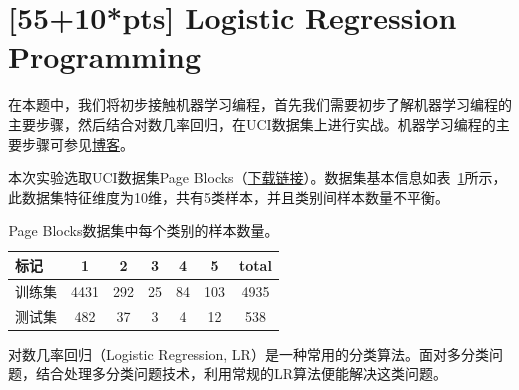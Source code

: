 \documentclass[a4paper,UTF8]{article}
\numberwithin{equation}{section}
\begin{document}
\section{[55+10*pts] Logistic Regression Programming}
在本题中，我们将初步接触机器学习编程，首先我们需要初步了解机器学习编程的主要步骤，然后结合对数几率回归，在UCI数据集上进行实战。机器学习编程的主要步骤可参见\href{http://blog.csdn.net/cqy_chen/article/details/78690975}{博客}。

本次实验选取UCI数据集Page Blocks（\href{http://lamda.nju.edu.cn/ml2018/PS2/PS2_dataset.zip}{下载链接}）。数据集基本信息如表~\ref{data_inf}所示，此数据集特征维度为10维，共有5类样本，并且类别间样本数量不平衡。

\begin{table}[!h]
	\centering
	\caption{Page Blocks数据集中每个类别的样本数量。}\vspace{3mm}
	\label{data_inf}
	\begin{tabular}{l|cccccc}\hline
		标记     & 1    & 2   & 3  & 4  & 5   & total \\ \hline
		训练集   & 4431 & 292 & 25 & 84 & 103 & 4935  \\
		测试集   & 482  & 37  & 3  & 4  & 12  & 538   \\ \hline
	\end{tabular}
\end{table}

对数几率回归（Logistic Regression, LR）是一种常用的分类算法。面对多分类问题，结合处理多分类问题技术，利用常规的LR算法便能解决这类问题。
\end{document}
